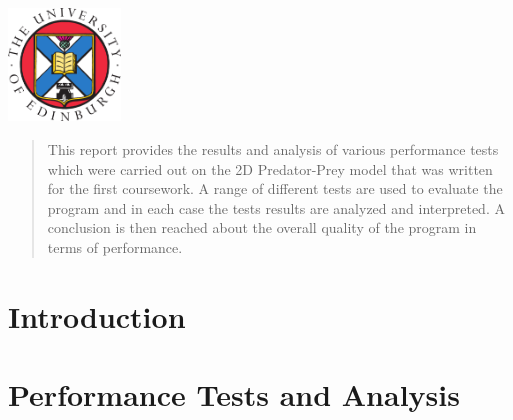 \begin{titlepage}
\includegraphics[width=3cm, height=3cm]{logo.png}\\[3cm] %
 

\vfill %

\end{titlepage}

\begin{abstract}
This report provides the results and analysis of various performance tests which were carried out on the 2D Predator-Prey model that was written for the first coursework. A range of different tests are used to evaluate the program and in each case the tests results are analyzed and interpreted. A conclusion is then reached about the overall quality of the program in terms of performance. 
\end{abstract}
\listoffigures
\listoftables
\tableofcontents

\section{Introduction}
\label{sec:introduction}
 

\section{Performance Tests and Analysis}
\label{sec:perf}


